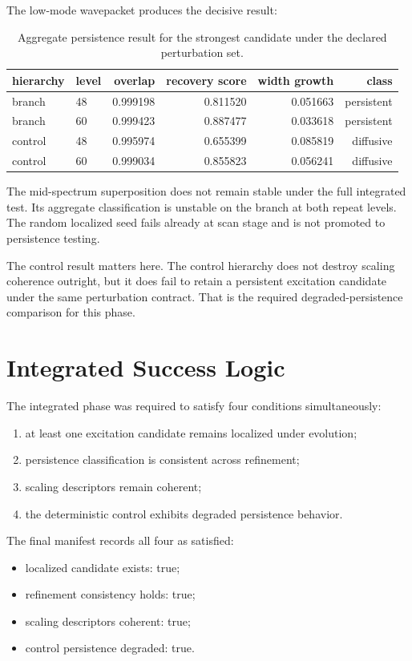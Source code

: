 \documentclass[11pt]{article}
\begin{document}
The low-mode wavepacket produces the decisive result:

\begin{table}[t]
\centering
\small
\begin{tabular}{@{}llrrrr@{}}
\toprule
hierarchy & level & overlap & recovery score & width growth & class \\
\midrule
branch & 48 & 0.999198 & 0.811520 & 0.051663 & persistent \\
branch & 60 & 0.999423 & 0.887477 & 0.033618 & persistent \\
control & 48 & 0.995974 & 0.655399 & 0.085819 & diffusive \\
control & 60 & 0.999034 & 0.855823 & 0.056241 & diffusive \\
\bottomrule
\end{tabular}
\caption{Aggregate persistence result for the strongest candidate under the declared perturbation set.}
\label{tab:persistence}
\end{table}

The mid-spectrum superposition does not remain stable under the full integrated test. Its aggregate classification is unstable on the branch at both repeat levels. The random localized seed fails already at scan stage and is not promoted to persistence testing.

The control result matters here. The control hierarchy does not destroy scaling coherence outright, but it does fail to retain a persistent excitation candidate under the same perturbation contract. That is the required degraded-persistence comparison for this phase.

\section{Integrated Success Logic}

The integrated phase was required to satisfy four conditions simultaneously:
\begin{enumerate}
\item at least one excitation candidate remains localized under evolution;
\item persistence classification is consistent across refinement;
\item scaling descriptors remain coherent;
\item the deterministic control exhibits degraded persistence behavior.
\end{enumerate}

The final manifest records all four as satisfied:
\begin{itemize}
\item localized candidate exists: true;
\item refinement consistency holds: true;
\item scaling descriptors coherent: true;
\item control persistence degraded: true.
\end{itemize}
\end{document}
